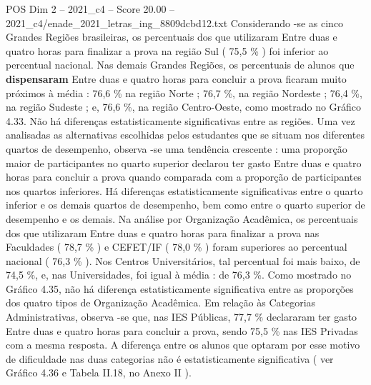 \begin{textsample}{POS Dim 2 – 2021\_c4 – Score 20.00 – 2021\_c4/enade\_2021\_letras\_ing\_8809dcbd12.txt}
Considerando -se as cinco Grandes Regiões brasileiras, os percentuais dos que utilizaram Entre duas e quatro horas para finalizar a prova na região Sul ( 75,5 \% ) foi inferior ao percentual nacional.
Nas demais Grandes Regiões, os percentuais de alunos que \textbf{dispensaram} Entre duas e quatro horas para concluir a prova ficaram muito próximos à média : 76,6 \% na região Norte ; 76,7 \%, na região Nordeste ; 76,4 \%, na região Sudeste ; e, 76,6 \%, na região Centro-Oeste, como mostrado no Gráfico 4.33.
Não há diferenças estatisticamente significativas entre as regiões.
Uma vez analisadas as alternativas escolhidas pelos estudantes que se situam nos diferentes quartos de desempenho, observa -se uma tendência crescente : uma proporção maior de participantes no quarto superior declarou ter gasto Entre duas e quatro horas para concluir a prova quando comparada com a proporção de participantes nos quartos inferiores.
Há diferenças estatisticamente significativas entre o quarto inferior e os demais quartos de desempenho, bem como entre o quarto superior de desempenho e os demais.
Na análise por Organização Acadêmica, os percentuais dos que utilizaram Entre duas e quatro horas para finalizar a prova nas Faculdades ( 78,7 \% ) e CEFET/IF ( 78,0 \% ) foram superiores ao percentual nacional ( 76,3 \% ).
Nos Centros Universitários, tal percentual foi mais baixo, de 74,5 \%, e, nas Universidades, foi igual à média : de 76,3 \%.
Como mostrado no Gráfico 4.35, não há diferença estatisticamente significativa entre as proporções dos quatro tipos de Organização Acadêmica.
Em relação às Categorias Administrativas, observa -se que, nas IES Públicas, 77,7 \% declararam ter gasto Entre duas e quatro horas para concluir a prova, sendo 75,5 \% nas IES Privadas com a mesma resposta.
A diferença entre os alunos que optaram por esse motivo de dificuldade nas duas categorias não é estatisticamente significativa ( ver Gráfico 4.36 e Tabela II.18, no Anexo II ).

\end{textsample}
